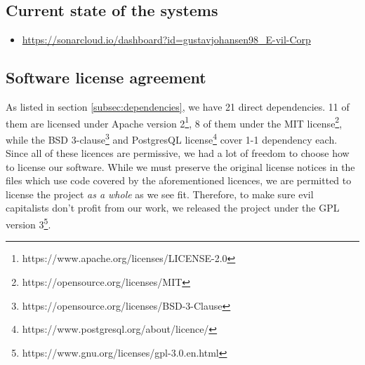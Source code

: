 \documentclass[report/main.tex]{subfiles}
\begin{document}
    \subsection{Current state of the systems}
    
    \begin{itemize}
        \item \textbf{} \url{https://sonarcloud.io/dashboard?id=gustavjohansen98_E-vil-Corp}
    \end{itemize}
    
    \subsection{Software license agreement}
    As listed in section \ref{subsec:dependencies}, we have 21 direct dependencies. 11 of them are licensed under Apache version 2\footnote{https://www.apache.org/licenses/LICENSE-2.0}, 8 of them under the MIT license\footnote{https://opensource.org/licenses/MIT}, while the BSD 3-clause\footnote{https://opensource.org/licenses/BSD-3-Clause} and PostgresQL license\footnote{https://www.postgresql.org/about/licence/} cover 1-1 dependency each. Since all of these licences are permissive, we had a lot of freedom to choose how to license our software. While we must preserve the original license notices in the files which use code covered by the aforementioned licences, we are permitted to license the project \textit{as a whole} as we see fit. Therefore, to make sure evil capitalists don't profit from our work, we released the project under the GPL version 3\footnote{https://www.gnu.org/licenses/gpl-3.0.en.html}.
    
\end{document}
